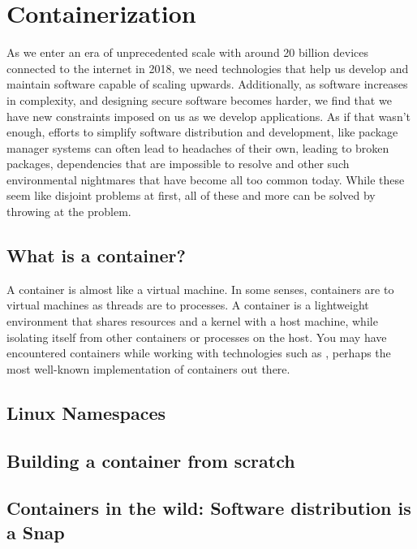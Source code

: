 \section{Containerization}
As we enter an era of unprecedented scale with around 20 billion devices
connected to the internet in 2018, we need technologies that help us develop and
maintain software capable of scaling upwards. Additionally, as software increases
in complexity, and designing secure software becomes harder, we find that we
have new constraints imposed on us as we develop applications. As if that wasn't
enough, efforts to simplify software distribution and development, like package
manager systems can often lead to headaches of their own, leading to broken
packages, dependencies that are impossible to resolve and other such
environmental nightmares that have become all too common today. While these seem
like disjoint problems at first, all of these and more can be solved by throwing
 at the problem.

\subsection{What is a container?}
A container is almost like a virtual machine.
In some senses, containers are to virtual machines as threads are to processes.
A container is a lightweight environment that shares resources and a kernel with
a host machine, while isolating itself from other containers or processes on the
host. You may have encountered containers while working with technologies such
as , perhaps the most well-known implementation of containers
out there.

\subsection{Linux Namespaces}

\subsection{Building a container from scratch}

\subsection{Containers in the wild: Software distribution is a Snap}
